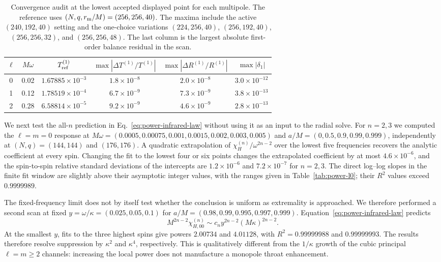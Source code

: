 \documentclass[aps,prd,twocolumn,10pt,nofootinbib,superscriptaddress,floatfix]{revtex4-2}
\begin{document}
\begin{table}[t]
\caption{Convergence audit at the lowest accepted displayed point for each
multipole.  The reference uses $(N,q,r_{\rm m}/M)=(256,256,40)$.  The
maxima include the active $(240,192,40)$ setting and the one-choice variations
$(224,256,40)$, $(256,192,40)$, $(256,256,32)$, and $(256,256,48)$.  The last
column is the largest absolute first-order balance residual in the scan.}
\label{tab:low-convergence}
\begin{ruledtabular}
\begin{tabular}{c c c c c c}
$\ell$ & $M\omega$ & $T^{(1)}_{\rm ref}$
& $\max|\Delta T^{(1)}/T^{(1)}|$
& $\max|\Delta R^{(1)}/R^{(1)}|$ & $\max|\delta_1|$\\
\hline
0 & 0.02 & $1.67885\times10^{-3}$ & $1.8\times10^{-8}$ & $2.0\times10^{-8}$ & $3.0\times10^{-12}$\\
1 & 0.12 & $1.78519\times10^{-4}$ & $6.7\times10^{-9}$ & $7.3\times10^{-9}$ & $3.8\times10^{-13}$\\
2 & 0.28 & $6.58814\times10^{-5}$ & $9.2\times10^{-9}$ & $4.6\times10^{-9}$ & $2.8\times10^{-13}$\\
\end{tabular}
\end{ruledtabular}
\end{table}

We next test the all-$n$ prediction in Eq.~\eqref{eq:power-infrared-law}
without using it as an input to the radial solve.  For $n=2,3$ we computed the
$\ell=m=0$ response at
$M\omega=(0.0005,0.00075,0.001,0.0015,0.002,0.003,0.005)$ and
$a/M=(0,0.5,0.9,0.99,0.999)$, independently at
$(N,q)=(144,144)$ and $(176,176)$.  A quadratic extrapolation of
$\chi_H^{(n)}/\omega^{2n-2}$ over the lowest five frequencies recovers the
analytic coefficient at every spin.  Changing the fit to the lowest four or
six points changes the extrapolated coefficient by at most
$4.6\times10^{-6}$, and the spin-to-spin relative standard deviations of the
intercepts are $1.2\times10^{-6}$ and $7.2\times10^{-7}$ for $n=2,3$.
The direct log--log slopes in the finite fit window are slightly above their
asymptotic integer values, with the ranges given in
Table~\ref{tab:power-l0}; their $R^2$ values exceed $0.9999989$.

The fixed-frequency limit does not by itself test whether the conclusion is
uniform as extremality is approached.  We therefore performed a second scan
at fixed $y=\omega/\kappa=(0.025,0.05,0.1)$ for
$a/M=(0.98,0.99,0.995,0.997,0.999)$.  Equation~\eqref{eq:power-infrared-law}
predicts
\begin{equation}
 M^{2n-2}\chi_{H,00}^{(n)}
 \sim c_n y^{2n-2}(M\kappa)^{2n-2}.
 \label{eq:power-kappa-law}
\end{equation}
At the smallest $y$, fits to the three highest spins give powers
$2.00734$ and $4.01128$, with $R^2=0.99999988$ and $0.99999993$.
The results therefore resolve suppression by $\kappa^2$ and $\kappa^4$,
respectively.  This is qualitatively different from the $1/\kappa$ growth of
the cubic principal $\ell=m\ge2$ channels: increasing the local power
does not manufacture a monopole throat enhancement.
\end{document}
